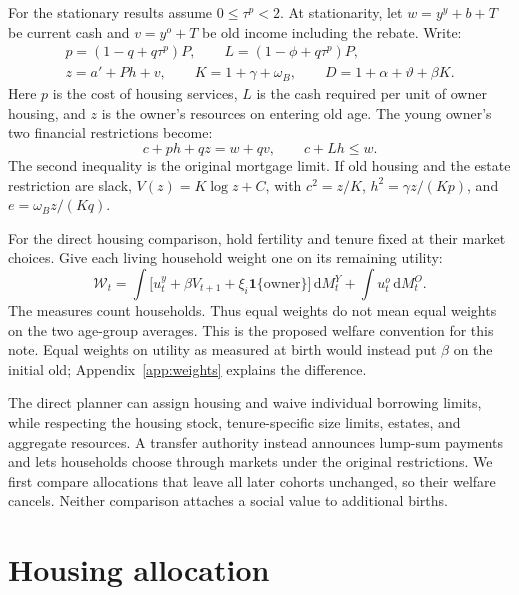 \documentclass[11pt]{article}
\newcommand{\dd}{\mathrm d}
\begin{document}
For the stationary results assume $0\le\tau^p<2$. At stationarity, let
$w=y^y+b+T$ be current cash and $v=y^o+T$ be old income
including the rebate. Write:
\begin{equation}
\begin{gathered}
p=(1-q+q\tau^p)P,\qquad L=(1-\phi+q\tau^p)P,\\
z=a'+Ph+v,\qquad K=1+\gamma+\omega_B,\qquad
D=1+\alpha+\vartheta+\beta K.
\end{gathered}
\label{eq:reduction_objects}
\end{equation}
Here $p$ is the cost of housing services, $L$ is the cash required per unit
of owner housing, and $z$ is the owner's resources on entering old age.
The young owner's two financial restrictions become:
\begin{equation}
c+ph+qz=w+qv,\qquad c+Lh\le w.
\label{eq:reduced}
\end{equation}
The second inequality is the original mortgage limit. If old housing and the
estate restriction are slack, $V(z)=K\log z+C$, with
$c^2=z/K$, $h^2=\gamma z/(Kp)$, and $e=\omega_Bz/(Kq)$.

For the direct housing comparison, hold fertility and tenure fixed at their
market choices. Give each living household weight one on its remaining
utility:
\begin{equation}
\mathcal W_t=\int\bigl[u_t^y+\beta V_{t+1}
 +\xi_i\mathbf 1\{\text{owner}\}\bigr]\,\dd M_t^Y
 +\int u_t^o\,\dd M_t^O.
\label{eq:welfare}
\end{equation}
The measures count households. Thus equal weights do not mean equal weights
on the two age-group averages. This is the proposed welfare convention for
this note. Equal weights on utility as measured at birth would instead put
$\beta$ on the initial old; Appendix~\ref{app:weights} explains the difference.

The direct planner can assign housing and waive individual borrowing limits,
while respecting the housing stock, tenure-specific size limits, estates, and
aggregate resources. A transfer authority instead announces lump-sum payments
and lets households choose through markets under the original restrictions.
We first compare allocations that leave all later cohorts unchanged, so their
welfare cancels. Neither comparison attaches a social value to additional births.

\section{Housing allocation}
\end{document}
